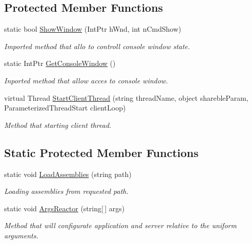 \subsection*{Protected Member Functions}
\begin{DoxyCompactItemize}
\item 
static bool \mbox{\hyperlink{class_uniform_client_1_1_base_client_a47b6d88848854c59fafefeeae3956699}{Show\+Window}} (Int\+Ptr h\+Wnd, int n\+Cmd\+Show)
\begin{DoxyCompactList}\small\item\em Imported method that allo to controll console window state. \end{DoxyCompactList}\item 
static Int\+Ptr \mbox{\hyperlink{class_uniform_client_1_1_base_client_aafcfed25b79baed0db4448f2e30f2aa2}{Get\+Console\+Window}} ()
\begin{DoxyCompactList}\small\item\em Inported method that allow acces to console window. \end{DoxyCompactList}\item 
virtual Thread \mbox{\hyperlink{class_uniform_client_1_1_base_client_a194b46bb0e889d07cade81c0aeab7cea}{Start\+Client\+Thread}} (string thread\+Name, object shareble\+Param, Parameterized\+Thread\+Start client\+Loop)
\begin{DoxyCompactList}\small\item\em Method that starting client thread. \end{DoxyCompactList}\end{DoxyCompactItemize}
\subsection*{Static Protected Member Functions}
\begin{DoxyCompactItemize}
\item 
static void \mbox{\hyperlink{class_uniform_client_1_1_base_client_a8abbd1d46cc50556eeae8bbd55ce680f}{Load\+Assemblies}} (string path)
\begin{DoxyCompactList}\small\item\em Loading assemblies from requested path. \end{DoxyCompactList}\item 
static void \mbox{\hyperlink{class_uniform_client_1_1_base_client_a7ec48981cf3e7ec10d2cb7dff81f912a}{Args\+Reactor}} (string\mbox{[}$\,$\mbox{]} args)
\begin{DoxyCompactList}\small\item\em Method that will configurate application and server relative to the uniform arguments. \end{DoxyCompactList}\end{DoxyCompactItemize}
